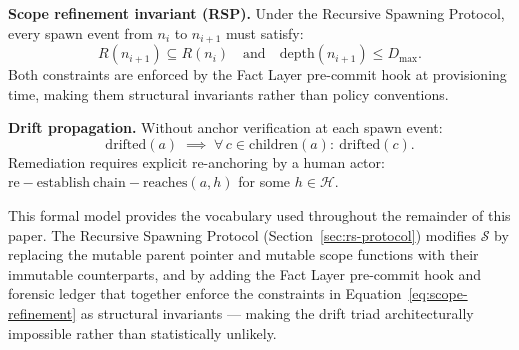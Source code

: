 \medskip
\noindent\textbf{Scope refinement invariant (RSP).} Under the Recursive Spawning Protocol, every spawn event from $n_i$ to $n_{i+1}$ must satisfy:
\begin{equation}
R(n_{i+1}) \subseteq R(n_i) \quad \text{and} \quad \mathrm{depth}(n_{i+1}) \leq D_{\max}.
\label{eq:scope-refinement}
\end{equation}
Both constraints are enforced by the Fact Layer pre-commit hook at provisioning time, making them structural invariants rather than policy conventions.

\medskip
\noindent\textbf{Drift propagation.} Without anchor verification at each spawn event:
\begin{equation}
\mathrm{drifted}(a) \;\implies\; \forall\, c \in \mathrm{children}(a):\ \mathrm{drifted}(c).
\label{eq:drift-propagation}
\end{equation}
Remediation requires explicit re-anchoring by a human actor: $\mathrm{re-establish\ chain-reaches}(a, h)$ for some $h \in \mathcal{H}$.

This formal model provides the vocabulary used throughout the remainder of this paper. The Recursive Spawning Protocol (Section~\ref{sec:rs-protocol}) modifies $\mathcal{S}$ by replacing the mutable parent pointer and mutable scope functions with their immutable counterparts, and by adding the Fact Layer pre-commit hook and forensic ledger that together enforce the constraints in Equation~\ref{eq:scope-refinement} as structural invariants — making the drift triad architecturally impossible rather than statistically unlikely.